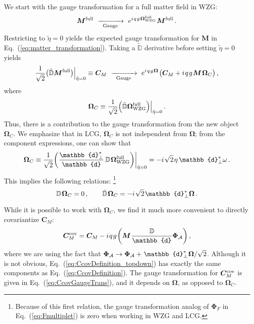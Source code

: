 \documentclass[12pt,document,nofootinbib,superscriptaddress,onecolumn,preprintnumbers,balancelastpage]{article}
\newcommand{\full}{\text{full}}
\newcommand{\s}{\hspace{0.8pt}}
\newcommand{\PP}{\mathbb{d}}
\newcommand{\gauge}{\,\,\xrightarrow[\hspace{5pt}\text{Gauge}\hspace{5pt}]{}\,\,}
\DeclareRobustCommand{\Eq}[1]{Eq.~(\ref{#1})}
\newcommand{\bPhi}{ \boldsymbol \Phi}
\newcommand{\bM}{ \boldsymbol M}
\newcommand{\bPhiA}{ \boldsymbol{\Phi}_\alc}
\newcommand{\bC}{ \boldsymbol C}
\newcommand{\D}{\mathbb{D}}
\newcommand{\RCA}{\boldsymbol{\Omega}}
\newcommand{\alc}{\mathcal{A}}
\begin{document}
\begin{spacing}{1.2}
We start with the gauge transformation for a full matter field in WZG:
%
\begin{equation}
\bM^\full \gauge e^{i\s q\s g\s \RCA_{\rm WZG}^\full}\s \bM^\full\,.
\end{equation}
%
Restricting to $\tilde{\eta} = 0$ yields the expected gauge transformation for $\bM$ in \Eq{eq:matter_transformation}.
%
Taking a $\tilde{\D}$ derivative before setting $\tilde{\eta} = 0$ yields
%
\begin{align}
\frac{1}{\sqrt{2}} \big(\tilde{\D}\bM^\full \big) \Big|_{\tilde{\eta} = 0} \equiv \bC_M \gauge e^{i\s q\s g\s \RCA}\s \big( \bC_M + i \s q \s g \s \bM \s \RCA_C  \big)\,,
\end{align}
%
where
%
\begin{align}
\RCA_C \equiv \frac{1}{\sqrt{2}} \Big(\tilde{\D} \RCA_{\rm WZG}^\full \Big)\Big|_{\tilde{\eta} = 0}\,.
\end{align}
%
Thus, there is a contribution to the gauge transformation from the new object $\RCA_C$.
%
We emphasize that in LCG, $\RCA_C$ is not independent from $\RCA$; from the component expressions, one can show that
%
\begin{equation}
\RCA_C \equiv \frac{1}{\sqrt{2}}\bigg(\frac{\PP_\perp^*}{\PP}\, \D\s \RCA^{\rm full}_{\rm WZG} \bigg) \bigg|_{\tilde{\eta} = 0} = -i \s \sqrt{2}\s \eta \, \PP_\perp^* \omega\,.
\end{equation}
%
This implies the following relations:%
%
\footnote{Because of this first relation, the gauge transformation analog of $\bPhi_F$ in \Eq{eq:Fmultiplet} is zero when working in WZG and LCG.}
%
\begin{equation}
\D\s \RCA_C = 0\,, \qquad \bar{\D}\s \RCA_C = -i \s \sqrt{2} \s \PP_\perp^* \RCA\,.
\end{equation}


While it is possible to work with $\RCA_C$, we find it much more convenient to directly covariantize $\bC_M$:
%
\begin{equation}
\label{eq:CcovDefinition_topdown}
\bC^{\rm cov}_M = \bC_M - i \s q\s g\s \bigg( \bM \s \frac{\D}{\PP} \bPhiA \bigg)\,,
\end{equation}
%
where we are using the fact that $\bPhiA \to \bPhiA + \s \PP_\perp^*\s \RCA / \sqrt{2}$. 
%
Although it is not obvious, \Eq{eq:CcovDefinition_topdown} has exactly the same components as \Eq{eq:CcovDefinition}.
%
The gauge transformation for $\bC^{\rm cov}_M$ is given in \Eq{eq:CcovGaugeTrans}, and it depends on $\RCA$, as opposed to $\RCA_C$.



\end{spacing}
\end{document}
